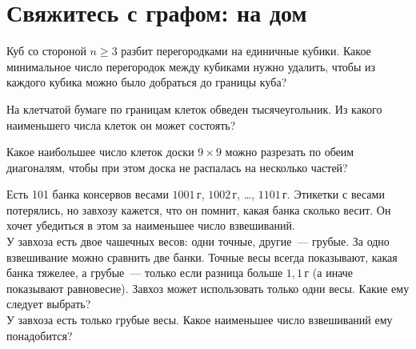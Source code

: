 
\section*{Свяжитесь с графом: на дом}



\begin{problems}

Куб со стороной $n \geq 3$ разбит перегородками на единичные кубики.
Какое минимальное число перегородок между кубиками нужно удалить, чтобы
из каждого кубика можно было добраться до границы куба?

На клетчатой бумаге по границам клеток обведен тысячеугольник.
Из какого наименьшего числа клеток он может состоять?

Какое наибольшее число клеток доски $9 \times 9$ можно разрезать по обеим
диагоналям, чтобы при этом доска не распалась на несколько частей?

Есть 101 банка консервов весами
$1001\,\text{г}$, $1002\,\text{г}$, \ldots, $1101\,\text{г}$.
Этикетки с весами потерялись, но завхозу кажется, что он помнит, какая банка
сколько весит.
Он хочет убедиться в этом за наименьшее число взвешиваний.
\\
\sp
У завхоза есть двое чашечных весов: одни точные, другие~--- грубые.
За одно взвешивание можно сравнить две банки.
Точные весы всегда показывают, какая банка тяжелее, а грубые~--- только если
разница больше $1{,}1\,\text{г}$ (а иначе показывают равновесие).
Завхоз может использовать только одни весы.
Какие ему следует выбрать?
\\
\sp
У завхоза есть только грубые весы.
Какое наименьшее число взвешиваний ему понадобится?

\end{problems}

